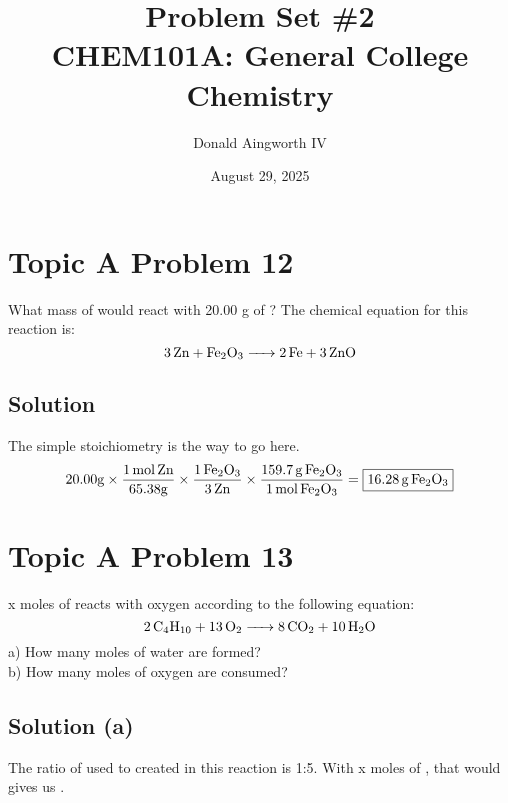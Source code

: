 \documentclass[10pt]{article}
\title{
    Problem Set \#2
    \\  \small
    CHEM101A: General College Chemistry
    }
\author{Donald Aingworth IV}
\date{August 29, 2025}
\begin{document}

    \maketitle

    \pagebreak
    \section{Topic A Problem 12}
        What mass of  would react with 20.00 g of ? 
        The chemical equation for this reaction is: 
        \begin{equation}
            \ce{3Zn + Fe2O3 -> 2Fe + 3ZnO}
        \end{equation}

        \subsection{Solution}
            The simple stoichiometry is the way to go here.
            \begin{equation}
                20.00 \unit{\gram} \times \frac{1\,\unit{\mole}\,\ce{Zn}}{65.38 \unit{\gram}} \times \frac{1\,\ce{Fe2O3}}{3\,\ce{Zn}} \times \frac{159.7\,\unit{\gram}\,\ce{Fe2O3}}{1\,\unit{\mole}\,\ce{Fe2O3}}  =   \boxed{16.28\,\unit{\gram}\,\ce{Fe2O3}}
            \end{equation}
            
    \pagebreak
    \section{Topic A Problem 13}
        x moles of  reacts with oxygen according to the following equation: 
        \begin{equation}
            \ce{2C4H10 + 13O2 -> 8CO2 + 10H2O}
        \end{equation}
        a) How many moles of water are formed?\\
        b) How many moles of oxygen are consumed?

        \subsection{Solution (a)}
            The ratio of  used to  created in this reaction is 1:5.
            With x moles of , that would gives us .
\end{document}
